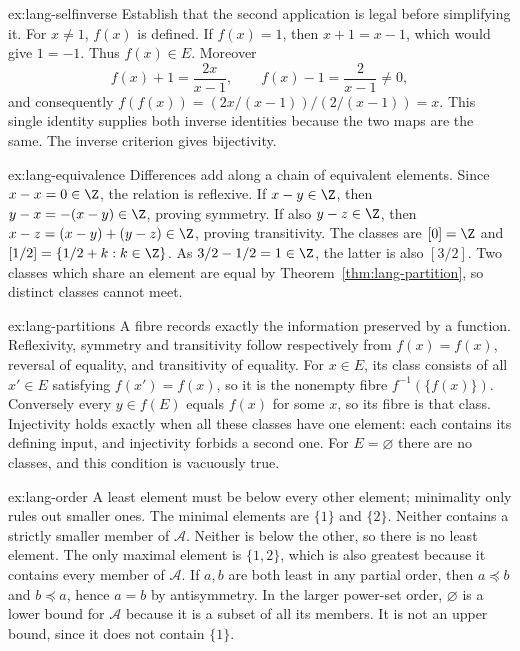 \begin{solution}{ex:lang-selfinverse}
\idea Establish that the second application is legal before simplifying it.
\writeup For $x\ne1$, $f(x)$ is defined. If $f(x)=1$, then $x+1=x-1$,
which would give $1=-1$. Thus $f(x)\in E$. Moreover
\[
f(x)+1=\frac{2x}{x-1},\qquad f(x)-1=\frac2{x-1}\ne0,
\]
and consequently $f(f(x))=(2x/(x-1))/(2/(x-1))=x$.
This single identity supplies both inverse identities because the two maps
are the same. The inverse criterion gives bijectivity.
\end{solution}

\begin{solution}{ex:lang-equivalence}
\idea Differences add along a chain of equivalent elements.
\writeup Since $x-x=0\in\Z$, the relation is reflexive. If $x-y\in\Z$,
then $y-x=-(x-y)\in\Z$, proving symmetry. If also $y-z\in\Z$, then
$x-z=(x-y)+(y-z)\in\Z$, proving transitivity. The classes are
$[0]=\Z$ and $[1/2]=\{1/2+k:k\in\Z\}$.
As $3/2-1/2=1\in\Z$, the latter is also $[3/2]$.
Two classes which share an element are equal by Theorem~\ref{thm:lang-partition},
so distinct classes cannot meet.
\end{solution}

\begin{solution}{ex:lang-partitions}
\idea A fibre records exactly the information preserved by a function.
\writeup Reflexivity, symmetry and transitivity follow respectively from
$f(x)=f(x)$, reversal of equality, and transitivity of equality.
For $x\in E$, its class consists of all $x'\in E$ satisfying $f(x')=f(x)$,
so it is the nonempty fibre $f^{-1}(\{f(x)\})$.
Conversely every $y\in f(E)$ equals $f(x)$ for some $x$, so its fibre is that
class. Injectivity holds exactly when all these classes have one element:
each contains its defining input, and injectivity forbids a second one.
For $E=\varnothing$ there are no classes, and this condition is vacuously true.
\end{solution}

\begin{solution}{ex:lang-order}
\idea A least element must be below every other element; minimality only rules out smaller ones.
\writeup The minimal elements are $\{1\}$ and $\{2\}$. Neither contains a
strictly smaller member of $\mathcal A$. Neither is below the other, so
there is no least element. The only maximal element is $\{1,2\}$, which
is also greatest because it contains every member of $\mathcal A$.
If $a,b$ are both least in any partial order, then $a\preceq b$ and
$b\preceq a$, hence $a=b$ by antisymmetry. In the larger power-set order,
$\varnothing$ is a lower bound for $\mathcal A$ because it is a subset
of all its members. It is not an upper bound, since it does not contain $\{1\}$.
\end{solution}

